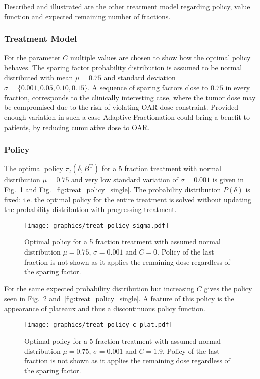 \documentclass[\relativeRoot/ada.tex]{subfiles}
\begin{document}
Described and illustrated are the other treatment model regarding policy, value function and expected remaining number of fractions.

\subsubsection{Treatment Model}

For the parameter $C$ multiple values are chosen to show how the optimal policy behaves. The sparing factor probability distribution is assumed to be normal distributed with mean $\mu=0.75$ and standard deviation $\sigma = \{ 0.001, 0.05, 0.10, 0.15\}$. A sequence of sparing factors close to $0.75$ in every fraction, corresponds to the clinically interesting case, where the tumor dose may be compromised due to the risk of violating OAR dose constraint. Provided enough variation in such a case Adaptive Fractionation could bring a benefit to patients, by reducing cumulative dose to OAR.

\subsubsection{Policy}

The optimal policy $\pi_t(\delta, B^{\text{T}})$ for a 5 fraction treatment with normal distribution $\mu=0.75$ and very low standard variation of $\sigma=0.001$ is given in Fig.~\ref{fig:treat_policy_sigma} and Fig.~\ref{fig:treat_policy_single}. The probability distribution $P(\delta)$ is fixed: i.e. the optimal policy for the entire treatment is solved without updating the probability distribution with progressing treatment.

\begin{figure}[!htb]
    \centering
    \texttt{[image: graphics/treat\_policy\_sigma.pdf]}
    \caption{Optimal policy for a 5 fraction treatment with assumed normal distribution $\mu=0.75$, $\sigma=0.001$ and $C=0$. Policy of the last fraction is not shown as it applies the remaining dose regardless of the sparing factor.}
    \label{fig:treat_policy_sigma}
\end{figure}

For the same expected probability distribution but increasing $C$ gives the policy seen in Fig.~\ref{fig:treat_policy_c_plat} and~\ref{fig:treat_policy_single}. A feature of this policy is the appearance of plateaux and thus a discontinuous policy function.

\begin{figure}[!htb]
    \centering
    \texttt{[image: graphics/treat\_policy\_c\_plat.pdf]}
    \caption{Optimal policy for a 5 fraction treatment with assumed normal distribution $\mu=0.75$, $\sigma=0.001$ and $C=1.9$. Policy of the last fraction is not shown as it applies the remaining dose regardless of the sparing factor.}
    \label{fig:treat_policy_c_plat}
\end{figure}
\end{document}

